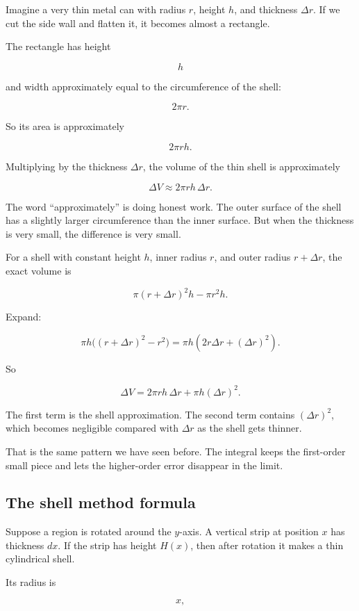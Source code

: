 Imagine a very thin metal can with radius \(r\), height \(h\), and thickness
\(\Delta r\).  If we cut the side wall and flatten it, it becomes almost a rectangle.

The rectangle has height

\[
h
\]

and width approximately equal to the circumference of the shell:

\[
2\pi r.
\]

So its area is approximately

\[
2\pi r h.
\]

Multiplying by the thickness \(\Delta r\), the volume of the thin shell is approximately

\[
\boxed{
\Delta V\approx 2\pi r h\,\Delta r.
}
\]


The word ``approximately'' is doing honest work.  The outer surface of the shell has
a slightly larger circumference than the inner surface.  But when the thickness is very
small, the difference is very small.

For a shell with constant height \(h\), inner radius \(r\), and outer radius
\(r+\Delta r\), the exact volume is

\[
\pi(r+\Delta r)^2h-\pi r^2h.
\]

Expand:

\[
\pi h\bigl((r+\Delta r)^2-r^2\bigr)
=
\pi h(2r\Delta r+(\Delta r)^2).
\]

So

\[
\Delta V
=
2\pi r h\,\Delta r+\pi h(\Delta r)^2.
\]

The first term is the shell approximation.  The second term contains
\((\Delta r)^2\), which becomes negligible compared with \(\Delta r\) as the shell
gets thinner.

That is the same pattern we have seen before.  The integral keeps the first-order
small piece and lets the higher-order error disappear in the limit.

\subsection{The shell method formula}
\label{subsec:shell-method-formula}

Suppose a region is rotated around the \(y\)-axis.  A vertical strip at position \(x\)
has thickness \(dx\).  If the strip has height \(H(x)\), then after rotation it makes a
thin cylindrical shell.

Its radius is

\[
x,
\]

